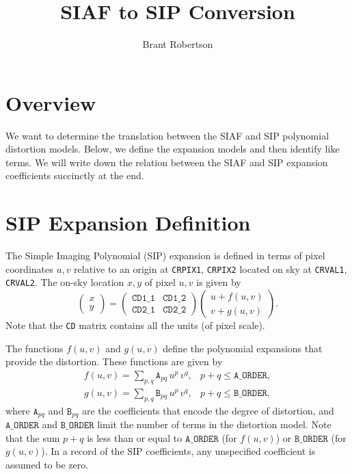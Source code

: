 \documentclass[10pt]{article}
\title{SIAF to SIP Conversion}
\author{Brant Robertson}
\newcommand{\sipA}[2]{\ensuremath{\mathtt{A}_{#1 #2}}}
\newcommand{\sipB}[2]{\ensuremath{\mathtt{B}_{#1 #2}}}
\begin{document}
\maketitle
\section{Overview}
We want to determine the translation between the SIAF and SIP 
polynomial distortion models. Below, we define the expansion models
and then identify like terms. We will write down the relation between
the SIAF and SIP expansion coefficients succinctly at the end.

\section{SIP Expansion Definition}
The Simple Imaging Polynomial (SIP) expansion is
defined in terms of pixel coordinates $u,v$ relative to 
an origin at {\tt CRPIX1}, {\tt CRPIX2} located on sky
at {\tt CRVAL1}, {\tt CRVAL2}.  The on-sky location $x,y$
of pixel $u,v$ is given by
\begin{equation}
\label{eqn:sip_expansion}
\left(\begin{array}{c}x\\y\end{array}\right) = \left(\begin{array}{cc} \mathtt{CD1\_1}&\mathtt{CD1\_2}\\\mathtt{CD2\_1}&\mathtt{CD2\_2}\end{array}\right)\left(\begin{array}{c} u + f(u,v)\\v+g(u,v)\end{array}\right).
\end{equation}
\noindent
Note that the {\tt CD} matrix contains all the units (of pixel scale).

The functions $f(u,v)$ and $g(u,v)$ define the polynomial expansions that provide the distortion. These
functions are given by
\begin{eqnarray}
\label{eqn:sip_f}
f(u,v) = \sum_{p,q} \sipA{p}{q} \,u^p \,v^q, & p+q \leq \mathtt{A\_ORDER},
\end{eqnarray}
\begin{eqnarray}
\label{eqn:sip_b}
g(u,v) = \sum_{p,q} \sipB{p}{q} \,u^p \,v^q, & p+q \leq \mathtt{B\_ORDER},
\end{eqnarray}
\noindent
where $\sipA{p}{q}$ and $\sipB{p}{q}$ are the coefficients that encode the degree of 
distortion, and $\mathtt{A\_ORDER}$
and $\mathtt{B\_ORDER}$ limit the number of terms in the distortion model. Note that the sum $p+q$ is less
than or equal to $\mathtt{A\_ORDER}$ (for $f(u,v)$) or $\mathtt{B\_ORDER}$ (for $g(u,v)$). In a record of the
SIP coefficients, any unspecified coefficient is assumed to be zero.
\end{document}
